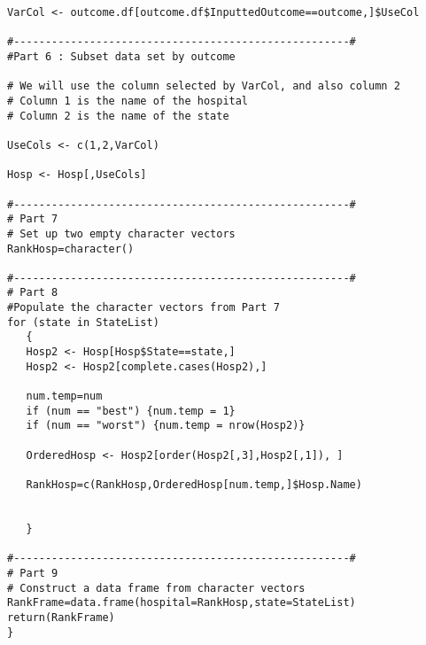 \documentclass[]{article}
\begin{document}
\begin{framed}
\begin{verbatim}
VarCol <- outcome.df[outcome.df$InputtedOutcome==outcome,]$UseCol

#-----------------------------------------------------#
#Part 6 : Subset data set by outcome

# We will use the column selected by VarCol, and also column 2
# Column 1 is the name of the hospital
# Column 2 is the name of the state

UseCols <- c(1,2,VarCol)

Hosp <- Hosp[,UseCols]

#-----------------------------------------------------#
# Part 7
# Set up two empty character vectors
RankHosp=character()

#-----------------------------------------------------#
# Part 8
#Populate the character vectors from Part 7
for (state in StateList)
   {
   Hosp2 <- Hosp[Hosp$State==state,]
   Hosp2 <- Hosp2[complete.cases(Hosp2),]
   
   num.temp=num
   if (num == "best") {num.temp = 1}
   if (num == "worst") {num.temp = nrow(Hosp2)}

   OrderedHosp <- Hosp2[order(Hosp2[,3],Hosp2[,1]), ]
        
   RankHosp=c(RankHosp,OrderedHosp[num.temp,]$Hosp.Name)
  
    
   }

#-----------------------------------------------------#
# Part 9
# Construct a data frame from character vectors
RankFrame=data.frame(hospital=RankHosp,state=StateList)
return(RankFrame)
}
\end{verbatim}
\end{framed}
\end{document}
